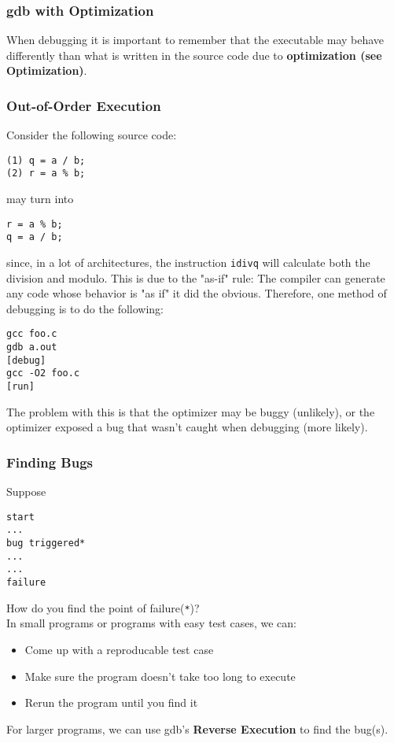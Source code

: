 \documentclass[13pt]{article}
\begin{document}
\subsubsection{gdb with Optimization}
When debugging it is important to remember that the executable may behave differently than what is written in the source code due to \textbf{optimization (see Optimization)}.

\subsubsection*{Out-of-Order Execution}
Consider the following source code:
\begin{verbatim}
(1) q = a / b;
(2) r = a % b;
\end{verbatim}
may turn into
\begin{verbatim}
r = a % b;
q = a / b;
\end{verbatim}
since, in a lot of architectures, the instruction \texttt{idivq} will calculate both the division and modulo. This is due to the "as-if" rule: The compiler can generate any code whose behavior is "as if" it did the obvious. Therefore, one method of debugging is to do the following:
\begin{verbatim}
gcc foo.c
gdb a.out
[debug]
gcc -O2 foo.c
[run]
\end{verbatim}
The problem with this is that the optimizer may be buggy (unlikely), or the optimizer exposed a bug that wasn't caught when debugging (more likely).

\subsubsection{Finding Bugs}
Suppose
\begin{verbatim}
start
...
bug triggered*
...
...
failure
\end{verbatim}
How do you find the point of failure(\texttt{*})? \\
In small programs or programs with easy test cases, we can:
\begin{itemize}[label=]
\item Come up with a reproducable test case
\item Make sure the program doesn't take too long to execute
\item Rerun the program until you find it
\end{itemize}
For larger programs, we can use gdb's \textbf{Reverse Execution} to find the bug(s).
\end{document}
